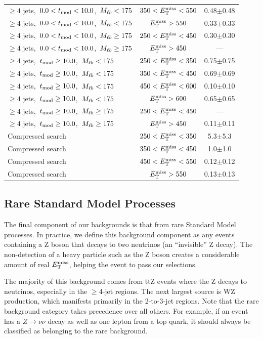 \begin{table}[htbp]
\begin{tabular}{|l|c|c|}
$\ge4$ jets,~$0.0< t_\text{mod} <10.0$,~$M_{\ell b} <175$ & $350<E_\text{T}^\text{miss}<550$ &  0.48$\pm$0.48  \\
$\ge4$ jets,~$0.0< t_\text{mod} <10.0$,~$M_{\ell b} <175$ & $E_\text{T}^\text{miss}>550$     &  0.33$\pm$0.33  \\
\hline
$\ge4$ jets,~$0.0< t_\text{mod} <10.0$,~$M_{\ell b} \ge175$ & $250<E_\text{T}^\text{miss}<450$ &  0.30$\pm$0.30  \\
$\ge4$ jets,~$0.0< t_\text{mod} <10.0$,~$M_{\ell b} \ge175$ & $E_\text{T}^\text{miss}>450$     &  ---  \\
\hline
$\ge4$ jets,~$t_\text{mod} \ge10.0$,~$M_{\ell b} <175$ & $250<E_\text{T}^\text{miss}<350$ &  0.75$\pm$0.75  \\
$\ge4$ jets,~$t_\text{mod} \ge10.0$,~$M_{\ell b} <175$ & $350<E_\text{T}^\text{miss}<450$ &  0.69$\pm$0.69  \\
$\ge4$ jets,~$t_\text{mod} \ge10.0$,~$M_{\ell b} <175$ & $450<E_\text{T}^\text{miss}<600$ &  0.10$\pm$0.10 \\
$\ge4$ jets,~$t_\text{mod} \ge10.0$,~$M_{\ell b} <175$ & $E_\text{T}^\text{miss}>600$     &  0.65$\pm$0.65  \\
\hline
$\ge4$ jets,~$t_\text{mod} \ge10.0$,~$M_{\ell b} \ge175$ & $250<E_\text{T}^\text{miss}<450$ &  ---  \\
$\ge4$ jets,~$t_\text{mod} \ge10.0$,~$M_{\ell b} \ge175$ & $E_\text{T}^\text{miss}>450$     &  0.11$\pm$0.11 \\
\hline
Compressed search & $250<E_\text{T}^\text{miss}<350$ & 5.3$\pm$5.3 \\
Compressed search & $350<E_\text{T}^\text{miss}<450$ & 1.0$\pm$1.0 \\
Compressed search & $450<E_\text{T}^\text{miss}<550$ & 0.12$\pm$0.12 \\
Compressed search & $E_\text{T}^\text{miss}>550$     & 0.13$\pm$0.13 \\
\hline
\end{tabular}
\end{table}

\subsection{Rare Standard Model Processes}
\label{ssec:stop:rarebkg}

The final component of our backgrounds is that from
rare Standard Model processes. In practice, we define this background
component as any events containing a Z boson that decays to
two neutrinos (an ``invisible'' Z decay). The non-detection of a heavy
particle such as the Z boson creates a considerable amount of real
$E_\text{T}^\text{miss}$, helping the event to pass our selections.

The majority of this background comes from ttZ events where the Z
decays to neutrinos, especially in the $\geq$4-jet regions. The next
largest source is WZ production, which manifests primarily in the
2-to-3-jet regions. Note that the rare background category takes
precedence over all others. For example, if an event has a $Z \rightarrow \nu\nu$
decay as well as one lepton from a top quark, it should always be
classified as belonging to the rare background.


